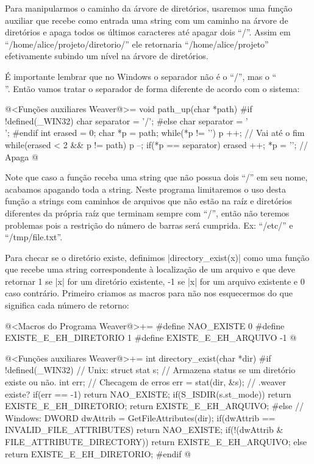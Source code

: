 
Para manipularmos o caminho da árvore de diretórios, usaremos uma
função auxiliar que recebe como entrada uma string com um caminho na
árvore de diretórios e apaga todos os últimos caracteres até apagar
dois ``/''. Assim em ``/home/alice/projeto/diretorio/'' ele retornaria
``/home/alice/projeto'' efetivamente subindo um nível na árvore de
diretórios.

É importante lembrar que no Windows o separador não é o ``/'', mas o
``\\''. Então vamos tratar o separador de forma diferente de acordo
com o sistema:

\iniciocodigo
@<Funções auxiliares Weaver@>=
void path_up(char *path){
#if !defined(_WIN32)
  char separator = '/';
#else
  char separator = '\\';
#endif
  int erased = 0;
  char *p = path;
  while(*p != '\0') p ++; // Vai até o fim
  while(erased < 2 && p != path){
    p --;
    if(*p == separator) erased ++;
    *p = '\0'; // Apaga
  }
}
@
\fimcodigo

Note que caso a função receba uma string que não possua dois ``/'' em
seu nome, acabamos apagando toda a string. Neste programa limitaremos
o uso desta função a strings com caminhos de arquivos que não estão na
raíz e diretórios diferentes da própria raíz que terminam sempre com
``/'', então não teremos problemas pois a restrição do número de
barras será cumprida. Ex: ``/etc/'' e ``/tmp/file.txt''.


Para checar se o diretório  existe, definimos
|directory_exist(x)| como uma função que recebe uma string
correspondente à localização de um arquivo e que deve retornar 1 se
|x| for um diretório existente, -1 se |x| for um arquivo existente e 0
caso contrário. Primeiro criamos as macros para não nos esquecermos do
que significa cada número de retorno:

\iniciocodigo
@<Macros do Programa Weaver@>+=
#define NAO_EXISTE             0
#define EXISTE_E_EH_DIRETORIO  1
#define EXISTE_E_EH_ARQUIVO   -1
@
\fimcodigo

\iniciocodigo
@<Funções auxiliares Weaver@>+=
int directory_exist(char *dir){
#if !defined(_WIN32)
  // Unix:
  struct stat s; // Armazena status se um diretório existe ou não.
  int err; // Checagem de erros
  err = stat(dir, &s); // .weaver existe?
  if(err == -1) return NAO_EXISTE;
  if(S_ISDIR(s.st_mode)) return EXISTE_E_EH_DIRETORIO;
  return EXISTE_E_EH_ARQUIVO;
#else
  // Windows:
  DWORD dwAttrib = GetFileAttributes(dir);
  if(dwAttrib == INVALID_FILE_ATTRIBUTES) return NAO_EXISTE;
  if(!(dwAttrib & FILE_ATTRIBUTE_DIRECTORY)) return EXISTE_E_EH_ARQUIVO;
  else return EXISTE_E_EH_DIRETORIO;
#endif
}
@
\fimcodigo

